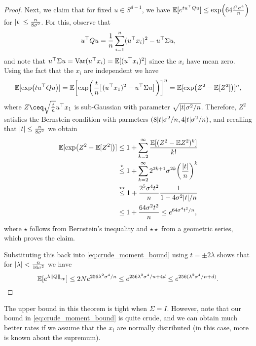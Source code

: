 \begin{proof}
	Next, we claim that for fixed $u \in S^{d-1}$, we have $\mathbb E[e^{tu^\top Q u}] \leq \exp(64\frac{t^2\sigma^4}{n})$ for $\abs{t} \leq \frac n{8\sigma^2}$.  For this, observe that 
	\[
	u^\top Q u = \frac1n \sum_{i=1}^n (u^\top x_i)^2 - u^\top \Sigma u, 
	\]
	and note that $u^\top \Sigma u = \operatorname{Var}(u^\top x_i) = \mathbb E[(u^\top x_i)^2]$ since the $x_i$ have mean zero. Using the fact that the $x_i$ are independent we have
	\[
	\mathbb E[\exp(t u^\top Q u)] = \mathbb E\qty[\exp(\frac tn \qty[(u^\top x_1)^2 - u^\top \Sigma u])]^n = \mathbb E[\exp(Z^2 - \mathbb E[Z^2])]^n, 
	\]
	where $Z \ceq \sqrt{\frac tn} u\T x_1$ is sub-Gaussian with parameter $\sqrt{\abs{t}\sigma^2/n}$. Therefore, $Z^2$ satisfies the Bernstein condition with parmeters $(8\abs{t} \sigma^2/n, 4 \abs{t}\sigma^2/n)$, and recalling that $\abs{t}\leq \frac n{8\sigma^2}$ we obtain 
	\begin{align*}
		\mathbb E[\exp(Z^2 - \mathbb E[Z^2])]  &\leq 1 + \sum_{k=2}^\infty \frac{\mathbb E[(Z^2 - \mathbb E Z^2)^k]}{k!} \\
		&\overset\star\leq 1 + \sum_{k=2}^\infty 2^{2k + 1} \sigma^{2k} \qty(\frac{\abs{t}}{n})^k \\
		&\overset{\star\star}\leq 1 + \frac{2^5 \sigma^4 t^2}{n} \frac{1}{1 - 4\sigma^2 \abs{t}/n} \\
		&\leq 1 + \frac{64 \sigma^2 t^2}{n} \leq e^{64 \sigma^4 t^2/n},
	\end{align*}
where $\star$ follows from Bernstein's inequality and $\star\star$ from a geometric series, which proves the claim. 

Substituting this back into \cref{eq:crude_moment_bound} using $t =  \pm 2\lambda$ shows that for $\abs{\lambda} < \frac{n}{16\sigma^2}$ we have
\[
	\mathbb E[e^{\lambda \norm{Q}_\mathrm{op}}] \leq 2N e^{256 \lambda^2 \sigma^4/n} \leq  e^{256\lambda^2\sigma^4/n + 4d} \leq  e^{256(\lambda^2 \sigma^4/n + d)}. 
\]
\end{proof}

The upper bound in this theorem is tight when $\Sigma = I$. However, note that our bound in \cref{eq:crude_moment_bound} is quite crude, and we can obtain much better rates if we assume that the $x_i$ are normally distributed (in this case, more is known about the supremum). 

